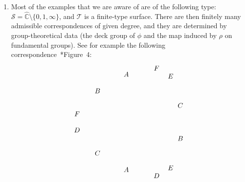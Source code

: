 \documentclass{amsart}
\newcommand\C{{\mathbb{C}}}
\newcommand{\rs}{\widehat{\C}}
\theoremstyle{definition}
\theoremstyle{remark}
\newcommand{\cT}{\mathcal{T}}
\newcommand{\cS}{\mathcal{S}}
\begin{document}
\begin{enumerate}
\item Most of the examples that we are aware of are of the following type: $\cS=\rs\setminus\{0,1,\infty\}$, and $\cT$ is a finite-type surface. There are then finitely many admissible correspondences of given degree, and they are determined by group-theoretical data (the deck group of $\phi$ and the map induced by $\rho$ on fundamental groups). See for example the following correspondence~\cite{MR4213769}*{Figure~4}:
  \[\begin{tikzpicture}
  \gdef\pathSR{(160:3) .. controls (180:2.6) .. (200:3)}
  \gdef\pathRS{(-40:3) .. controls (-15:2) and (15:2) .. (40:3)}
  \gdef\surfacelabels{
    \foreach \a/\x/\y/\z/\t in {0/B/C/F/D,120/A/B/D/E,240/C/A/E/F} {
      \draw[rotate=\a] node at (-20:2.5) {$\x$};
      \draw[rotate=\a] node at (20:2.5) {$\y$};
      \draw[rotate=\a] node at (172:3.0) {$\z$};
      \draw[rotate=\a] node at (188:3.0) {$\t$};
    }
  }
  \begin{scope}
  \surfacelabels
  \gdef\surfacecoords{
  \foreach \a/\i in {0/0,120/1,240/2} {
    \begin{scope}[rotate=\a]
      \path[name path=v0] \pathSR coordinate (R\i);
      \path[name path=w0] (0,0) -- (-3,0);

      \path[name path=v1] \pathRS coordinate (S\i);
      \path[name path=w1] (0,0) -- (3,0);
      \path[name intersections={of=v0 and w0,by=p0},name intersections={of=v1 and w1,by=p1}] (p0) coordinate (P\i) -- (p1) coordinate (Q\i);


\end{scope}}}
\end{scope}
\end{tikzpicture}\]
\end{enumerate}
\end{document}
